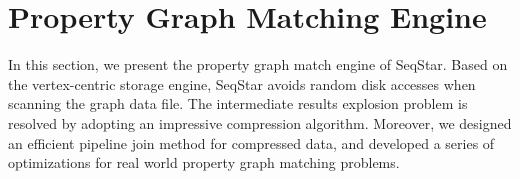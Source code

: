 \section{Property Graph Matching Engine}\label{sec:match}

In this section, we present the property graph match engine of SeqStar.
Based on the vertex-centric storage engine, SeqStar avoids random disk accesses when scanning the graph data file.
The intermediate results explosion problem is resolved by adopting an impressive compression algorithm.
Moreover, we designed an efficient pipeline join method for compressed data,
and developed a series of optimizations for real world property graph matching problems.




